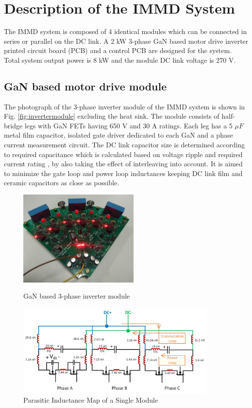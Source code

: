 
\section{Description of the IMMD System}

The IMMD system is composed of 4 identical modules which can be connected in series or parallel on the DC link. A 2 kW 3-phase GaN based motor drive inverter printed circuit board (PCB) and a control PCB are designed for the system. Total system output power is 8 kW and the module DC link voltage is 270 V.

\subsection{GaN based motor drive module}

The photograph of the 3-phase inverter module of the IMMD system is shown in Fig. \ref{fig:invertermodule} excluding the heat sink. The module consists of half-bridge legs with GaN FETs having 650 V and 30 A ratings. Each leg has a 5 $\mu F$ metal film capacitor, isolated gate driver dedicated to each GaN and a phase current measurement circuit. The DC link capacitor size is determined according to required capacitance which is calculated based on voltage ripple and required current rating \cite{Ugur2017}, by also taking the effect of interleaving into account. It is aimed to minimize the gate loop and power loop inductances keeping DC link film and ceramic capacitors as close as possible.

\begin{figure}[tb]
\begin{minipage}[b]{.4\linewidth}
\centering
\includegraphics[width=6cm]{figures/invertermodule.jpg}
\caption{GaN based 3-phase inverter module}
\label{fig:invertermodule}
\end{minipage}%
\begin{minipage}[b]{.6\linewidth}
\centering
\includegraphics[width=10cm]{figures/SingleModuleInductanceMap.jpg}
\caption{Parasitic Inductance Map of a Single Module}
\label{fig:SingleModuleInductanceMap}
\end{minipage}
\end{figure}

